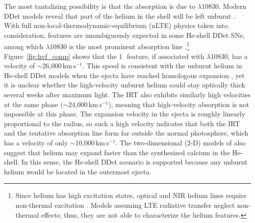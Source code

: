 \documentclass[twocolumn]{aastex631}
\newcommand{\kms}{$\mathrm{km}\,\mathrm{s}^{-1}$}
\begin{document}
The most tantalizing possibility is that the absorption is due to  $\lambda$10830. Modern DDet models reveal that part of the helium in the shell will be left unburnt \citep[e.g.,][]{Kromer_DD_2010,Woosley_2011,polin_observational_2019}. With full non-local-thermodynamic-equilibrium (nLTE) physics taken into consideration,  features are unambiguously expected in some He-shell DDet SNe, among which  $\lambda$10830 is the most prominent absorption line \citep{Dessart_2015,Boyle2017_Helium}.\footnote{Since helium has high excitation states, optical and NIR helium lines require non-thermal excitation \citep[e.g., collision with fast electrons;][]{Lucy_1991}. Models assuming LTE radiative transfer neglect non-thermal effects; thus, they are not able to characterize the helium features.} 
Figure~\ref{fig:hvf_comp} shows that the 1\,\micron\ feature, if associated with  $\lambda$10830, has a velocity of $\sim$26,000\,\kms. This speed is consistent with the unburnt helium in He-shell DDet models when the ejecta have reached homologous expansion \citep{Kromer_DD_2010, polin_observational_2019}, yet it is unclear whether the high-velocity unburnt helium could stay optically thick several weeks after maximum light. The  IRT also exhibits similarly high velocities at the same phase ($\sim$24,000\,\kms), meaning that high-velocity absorption is not impossible at this phase. The expansion velocity in the ejecta is roughly linearly proportional to the radius, so such a high velocity indicates that both the  IRT and the tentative  absorption line form far outside the normal photosphere, which has a velocity of only $\sim$10,000\,\kms. The two-dimensional (2-D) models of \citet{Kromer_DD_2010} also suggest that helium may expand faster than the synthesized calcium in the He-shell. In this sense, the He-shell DDet scenario is supported because any unburnt helium would be located in the outermost ejecta.
\end{document}
